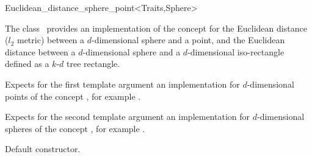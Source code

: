 

\begin{ccRefClass}{Euclidean_distance_sphere_point<Traits,Sphere>}  %


\ccDefinition
  
The class \ccRefName\ provides an implementation of the
 concept for the Euclidean distance ($l_2$
metric) between a $d$-dimensional sphere and a point, and the
Euclidean distance between a $d$-dimensional sphere and a
$d$-dimensional iso-rectangle defined as a $k$-$d$ tree rectangle.



\ccParameters
Expects for the first template argument an implementation for
$d$-dimensional points of the concept , for example
.

Expects for the second template argument an implementation 
for $d$-dimensional spheres of the concept ,
for example .


\ccIsModel


\ccTypes



\ccCreation
{}  %


{Default constructor.}

\ccOperations



\end{ccRefClass}
